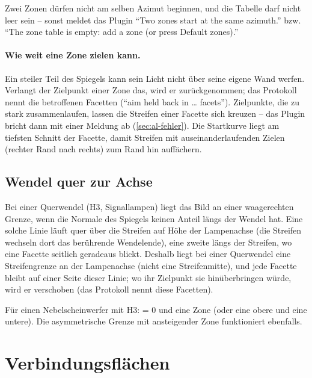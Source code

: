 \begin{hinweis}
Zwei Zonen dürfen nicht am selben Azimut beginnen, und die Tabelle darf nicht leer sein -- sonst
meldet das Plugin \enquote{Two zones start at the same azimuth.} bzw. \enquote{The zone table is empty:
add a zone (or press Default zones).}
\end{hinweis}

\paragraph{Wie weit eine Zone zielen kann.} Ein steiler Teil des Spiegels kann sein Licht nicht über
seine eigene Wand werfen. Verlangt der Zielpunkt einer Zone das, wird er zurückgenommen; das
Protokoll nennt die betroffenen Facetten (\enquote{aim held back in … facets}). Zielpunkte, die zu
stark zusammenlaufen, lassen die Streifen einer Facette sich kreuzen -- das Plugin bricht dann mit
einer Meldung ab (\autoref{sec:al-fehler}). Die Startkurve liegt am tiefsten Schnitt der Facette,
damit Streifen mit auseinanderlaufenden Zielen (rechter Rand nach rechts) zum Rand hin auffächern.

\subsection{Wendel quer zur Achse}

Bei einer Querwendel (H3, Signallampen) liegt das Bild an einer waagerechten Grenze, wenn die
Normale des Spiegels keinen Anteil längs der Wendel hat. Eine solche Linie läuft quer über die
Streifen auf Höhe der Lampenachse (die Streifen wechseln dort das berührende Wendelende), eine zweite
längs der Streifen, wo eine Facette seitlich geradeaus blickt. Deshalb liegt bei einer Querwendel eine
Streifengrenze an der Lampenachse (nicht eine Streifenmitte), und jede Facette bleibt auf einer Seite
dieser Linie; wo ihr Zielpunkt sie hinüberbringen würde, wird er verschoben (das Protokoll nennt
diese Facetten).

\begin{tipp}
Für einen Nebelscheinwerfer mit H3:  = 0 und eine Zone (oder eine obere und eine untere).
Die asymmetrische Grenze mit ansteigender Zone funktioniert ebenfalls.
\end{tipp}

\section{Verbindungsflächen}\label{sec:al-verbindung}

